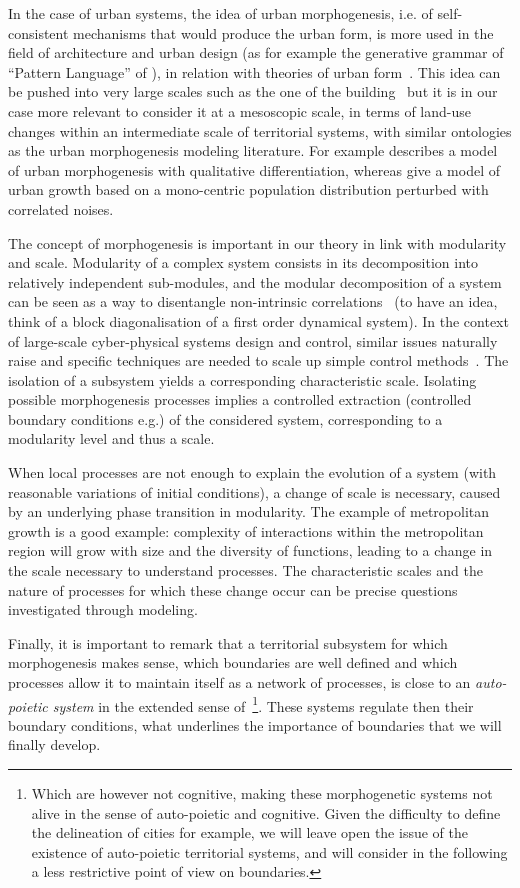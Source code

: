 \documentclass[letterpaper]{article}
\begin{document}
In the case of urban systems, the idea of urban morphogenesis, i.e. of self-consistent mechanisms that would produce the urban form, is more used in the field of architecture and urban design (as for example the generative grammar of ``Pattern Language'' of \cite{alexander1977pattern}), in relation with theories of urban form~\cite{moudon1997urban}. This idea can be pushed into very large scales such as the one of the building~\citep{whitehand1999urban} but it is in our case more relevant to consider it at a mesoscopic scale, in terms of land-use changes within an intermediate scale of territorial systems, with similar ontologies as the urban morphogenesis modeling literature. For example \cite{bonin2012modele} describes a model of urban morphogenesis with qualitative differentiation, whereas \cite{makse1998modeling} give a model of urban growth based on a mono-centric population distribution perturbed with correlated noises.


The concept of morphogenesis is important in our theory in link with modularity and scale. Modularity of a complex system consists in its decomposition into relatively independent sub-modules, and the modular decomposition of a system can be seen as a way to disentangle non-intrinsic correlations~\cite{2015arXiv150904386K} (to have an idea, think of a block diagonalisation of a first order dynamical system). In the context of large-scale cyber-physical systems design and control, similar issues naturally raise and specific techniques are needed to scale up simple control methods~\cite{2017arXiv170105880W}. The isolation of a subsystem yields a corresponding characteristic scale. Isolating possible morphogenesis processes implies a controlled extraction (controlled boundary conditions e.g.) of the considered system, corresponding to a modularity level and thus a scale.


When local processes are not enough to explain the evolution of a system (with reasonable variations of initial conditions), a change of scale is necessary, caused by an underlying phase transition in modularity. The example of metropolitan growth is a good example: complexity of interactions within the metropolitan region will grow with size and the diversity of functions, leading to a change in the scale necessary to understand processes. The characteristic scales and the nature of processes for which these change occur can be precise questions investigated through modeling.

Finally, it is important to remark that a territorial subsystem for which morphogenesis makes sense, which boundaries are well defined and which processes allow it to maintain itself as a network of processes, is close to an \emph{auto-poietic system} in the extended sense of~\cite{bourgine2004autopoiesis}\footnote{Which are however not cognitive, making these morphogenetic systems not alive in the sense of auto-poietic and cognitive. Given the difficulty to define the delineation of cities for example, we will leave open the issue of the existence of auto-poietic territorial systems, and will consider in the following a less restrictive point of view on boundaries.}. These systems regulate then their boundary conditions, what underlines the importance of boundaries that we will finally develop.
\end{document}
